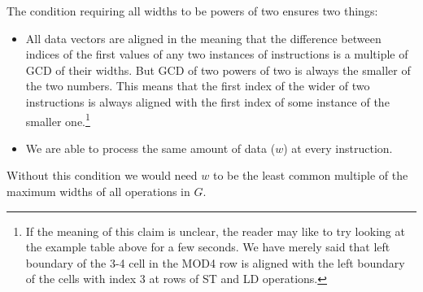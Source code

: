 \begin{rem}
  The condition requiring all widths to be powers of two ensures two things:
  \begin{itemize}
    \item All data vectors are aligned in the meaning that the difference between indices of the first values of any two instances of instructions is a multiple of GCD of their widths. But GCD of two powers of two is always the smaller of the two numbers. This means that the first index of the wider of two instructions is always aligned with the first index of some instance of the smaller one.\footnote{If the meaning of this claim is unclear, the reader may like to try looking at the example table above for a few seconds. We have merely said that left boundary of the 3-4 cell in the MOD4 row is aligned with the left boundary of the cells with index 3 at rows of ST and LD operations.}
    \item We are able to process the same amount of data ($w$) at every instruction.
  \end{itemize}
  Without this condition we would need $w$ to be the least common multiple of the maximum widths of all operations in $G$. 
\end{rem}

